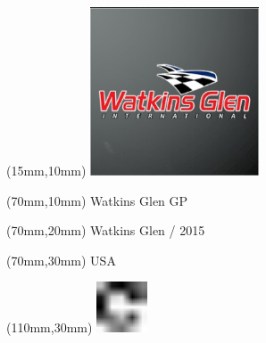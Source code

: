 \null\newpage
\begin{textblock*}{50mm}(15mm,10mm)%
\includegraphics[width=50mm]{LG/2015-05-20_00097.png}
\end{textblock*}
\begin{textblock*}{130mm}(70mm,10mm)%
{\fontsize{20}{20}\selectfont Watkins Glen GP}\\
\end{textblock*}
\begin{textblock*}{120mm}(70mm,20mm)%
{\fontsize{16}{16}\selectfont Watkins Glen / 2015}\\
\end{textblock*}
\begin{textblock*}{120mm}(70mm,30mm)%
{\fontsize{12}{12}\selectfont USA}
\end{textblock*}
\begin{textblock*}{30mm}(110mm,30mm)%
\centering
\includegraphics[height=15mm]{icons/fa-rotate-right.pdf}
\end{textblock*}
